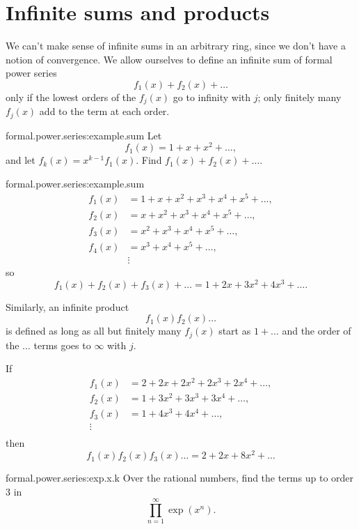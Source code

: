 \section{Infinite sums and products}
We can't make sense of infinite sums in an arbitrary ring, since we don't have a notion of convergence.
We allow ourselves to define an infinite sum of formal power series
\[
f_1(x)+f_2(x)+\dots
\]
only if the lowest orders of the \(f_j(x)\) go to infinity with \(j\); only finitely many \(f_j(x)\) add to the term at each order.
\begin{problem}{formal.power.series:example.sum}
Let 
\[
f_1(x)=1+x+x^2+\dots,
\]
and let \(f_k(x)=x^{k-1}f_1(x)\).
Find \(f_1(x)+f_2(x)+\dots\).
\end{problem}
\begin{answer}{formal.power.series:example.sum}
\begin{align*}
f_1(x)&=1+x+x^2+x^3+x^4+x^5+\dots,\\
f_2(x)&=x+x^2+x^3+x^4+x^5+\dots,\\
f_3(x)&=x^2+x^3+x^4+x^5+\dots,\\
f_4(x)&=x^3+x^4+x^5+\dots,\\
&\vdots
\end{align*}
so
\[
f_1(x)+f_2(x)+f_3(x)+\dots
=
1+2x+3x^2+4x^3+\dots.
\]
\end{answer}
Similarly, an infinite product
\[
f_1(x)f_2(x)\dots
\]
is defined as long as all but finitely many \(f_j(x)\) start as \(1+\dots\) and the order of the \(\dots\) terms goes to \(\infty\) with \(j\).
\begin{example}
If
\begin{align*}
f_1(x)&=2+2x+2x^2+2x^3+2x^4+\dots,\\
f_2(x)&=1+3x^2+3x^3+3x^4+\dots,\\
f_3(x)&=1+4x^3+4x^4+\dots,\\
\vdots&\\
\end{align*}
then
\[
f_1(x)f_2(x)f_3(x)\dots=2+2x+8x^2+\dots
\]
\end{example}
\begin{problem}{formal.power.series:exp.x.k}
Over the rational numbers, find the terms up to order \(3\) in
\[
\prod_{n=1}^{\infty}\exp(x^n).
\]
\end{problem}

